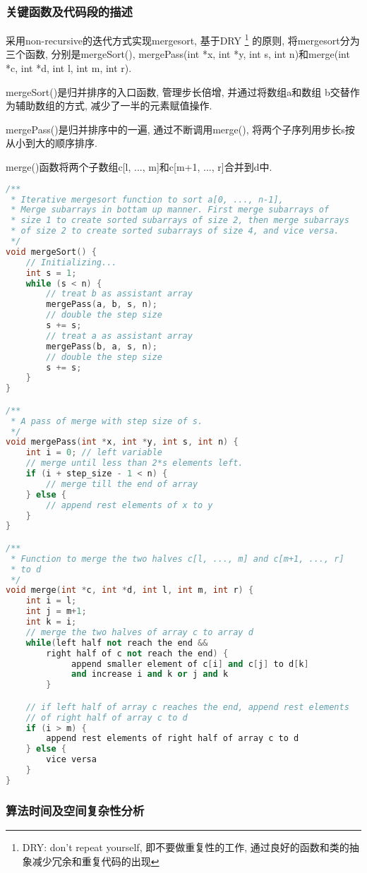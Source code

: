 \subsubsection{关键函数及代码段的描述}
采用non-recursive的迭代方式实现mergesort, 基于DRY \footnote{
	DRY: don't repeat yourself, 即不要做重复性的工作,
	通过良好的函数和类的抽象减少冗余和重复代码的出现}
的原则, 将mergesort分为三个函数, 分别是mergeSort(), mergePass(int *x,
int *y, int s, int n)和merge(int *c, int *d, int l, int m, int r). \par
mergeSort()是归并排序的入口函数, 管理步长倍增, 并通过将数组a和数组
b交替作为辅助数组的方式, 减少了一半的元素赋值操作. \par
mergePass()是归并排序中的一遍, 通过不断调用merge(),
将两个子序列用步长s按从小到大的顺序排序. \par
merge()函数将两个子数组c[l, ..., m]和c[m+1, ..., r]合并到d中.
\begin{lstlisting}[language=c++]
/**
 * Iterative mergesort function to sort a[0, ..., n-1], 
 * Merge subarrays in bottam up manner. First merge subarrays of
 * size 1 to create sorted subarrays of size 2, then merge subarrays
 * of size 2 to create sorted subarrays of size 4, and vice versa.
 */
void mergeSort() {
	// Initializing...
	int s = 1;
	while (s < n) {
		// treat b as assistant array
		mergePass(a, b, s, n);
		// double the step size
		s += s;
		// treat a as assistant array
		mergePass(b, a, s, n);
		// double the step size
		s += s;
	}
}

/**
 * A pass of merge with step size of s.
 */
void mergePass(int *x, int *y, int s, int n) {
	int i = 0; // left variable
	// merge until less than 2*s elements left.
	if (i + step_size - 1 < n) {
		// merge till the end of array
	} else {
		// append rest elements of x to y
	}
}

/**
 * Function to merge the two halves c[l, ..., m] and c[m+1, ..., r]
 * to d
 */
void merge(int *c, int *d, int l, int m, int r) {
	int i = l;
	int j = m+1;
	int k = i;
	// merge the two halves of array c to array d
	while(left half not reach the end &&
		right half of c not reach the end) {
			 append smaller element of c[i] and c[j] to d[k]
			 and increase i and k or j and k
		}

	// if left half of array c reaches the end, append rest elements
	// of right half of array c to d
	if (i > m) {
		append rest elements of right half of array c to d
	} else {
		vice versa
	}
}
\end{lstlisting}

\subsubsection{算法时间及空间复杂性分析}
